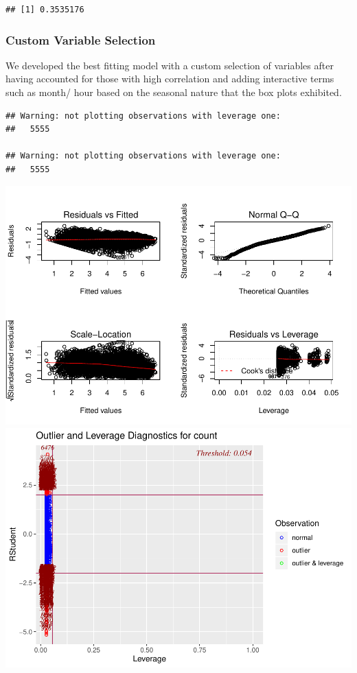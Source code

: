 \documentclass[american,]{article}
\begin{document}
\begin{verbatim}
## [1] 0.3535176
\end{verbatim}

\hypertarget{custom-variable-selection}{%
\subsubsection{Custom Variable Selection}\label{custom-variable-selection}}

We developed the best fitting model with a custom selection of variables after having accounted for those with high correlation and adding interactive terms such as month/ hour based on the seasonal nature that the box plots exhibited.

\begin{verbatim}
## Warning: not plotting observations with leverage one:
##   5555

## Warning: not plotting observations with leverage one:
##   5555
\end{verbatim}

\includegraphics{BikeSharingDemand_files/figure-latex/custom-model-1.pdf} \includegraphics{BikeSharingDemand_files/figure-latex/custom-model-2.pdf}
\end{document}

